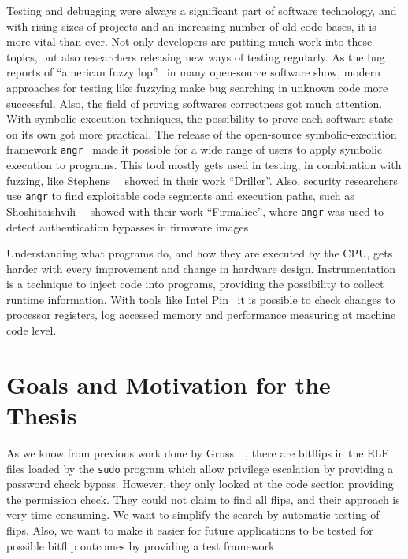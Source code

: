 Testing and debugging were always a significant part of software technology, and
with rising sizes of projects and an increasing number of old code bases, it is
more vital than ever. Not only developers are putting much work into these
topics, but also researchers releasing new ways of testing regularly. As the bug
reports of ``american fuzzy lop''~\cite{aflweb} in many open-source software
show, modern approaches for testing like fuzzying make bug searching in unknown
code more successful. Also, the field of proving software\textquotesingle s
correctness got much attention. With symbolic execution techniques, the
possibility to prove each software state on its own got more practical. The
release of the open-source symbolic-execution framework
\texttt{angr}~\cite{angrpaper} made it possible for a wide range of users to
apply symbolic execution to programs. This tool mostly gets used in testing, in
combination with fuzzing, like Stephens~\etal~\cite{driller} showed in their
work ``Driller''. Also, security researchers use \texttt{angr} to find
exploitable code segments and execution paths, such as
Shoshitaishvili~\etal~\cite{firmalice} showed with their work ``Firmalice'',
where \texttt{angr} was used to detect authentication bypasses in firmware
images.

Understanding what programs do, and how they are executed by the CPU, gets
harder with every improvement and change in hardware design. Instrumentation is
a technique to inject code into programs, providing the possibility to collect
runtime information. With tools like Intel Pin~\cite{pintool} it is possible to
check changes to processor registers, log accessed memory and performance
measuring at machine code level.

\section{Goals and Motivation for the Thesis}

As we know from previous work done by Gruss~\etal~\cite{flipinthewall}, there
are bitflips in the ELF files loaded by the \texttt{sudo} program which allow
privilege escalation by providing a password check bypass. However, they only
looked at the code section providing the permission check. They could not claim
to find all flips, and their approach is very time-consuming. We want to
simplify the search by automatic testing of flips. Also, we want to make it
easier for future applications to be tested for possible bitflip outcomes by
providing a test framework.

